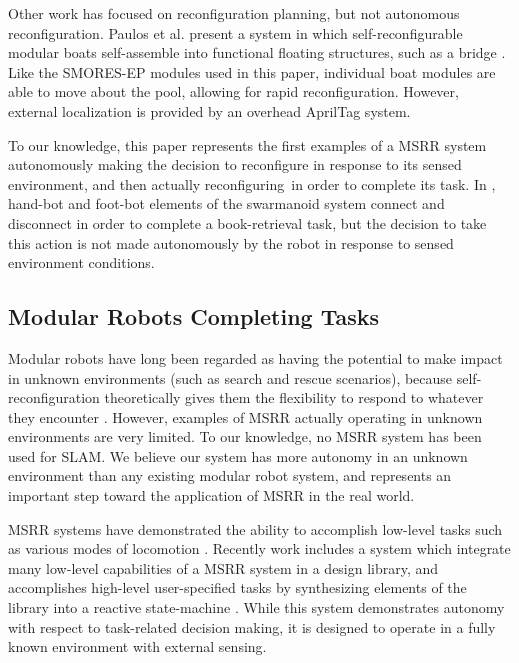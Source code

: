\documentclass[conference]{IEEEtran}
\begin{document}
Other work has focused on reconfiguration planning, but not autonomous reconfiguration.  Paulos et al. present a system in which self-reconfigurable modular boats self-assemble into functional floating structures, such as a bridge \cite{Paulos2015}.  Like the SMORES-EP modules used in this paper, individual boat modules are able to move about the pool, allowing for rapid reconfiguration.  However, external localization is provided by an overhead AprilTag system. 

To our knowledge, this paper represents the first examples of a MSRR system autonomously making the decision to reconfigure in response to its sensed environment, and then actually reconfiguring\ in order to complete its task.  In \cite{Dorigo2013}, hand-bot and foot-bot elements of the swarmanoid system connect and disconnect in order to complete a book-retrieval task, but the decision to take this action is not made autonomously by the robot in response to sensed environment conditions.
%
\subsection{Modular Robots Completing Tasks}
%
Modular robots have long been regarded as having the potential to make impact in unknown environments (such as search and rescue scenarios), because  self-reconfiguration theoretically gives them the flexibility to respond to whatever they encounter \cite{Yim2007a,Yim2000}.  However, examples of MSRR actually operating in unknown environments are very limited. To our knowledge, no MSRR system has been used for SLAM. We believe our system has more autonomy in an unknown environment than any existing modular robot system, and represents an important step toward the application of MSRR in the real world.

MSRR systems have demonstrated the ability to accomplish low-level tasks such as various modes of locomotion \cite{Yim1994}. Recently work includes a system which integrate many low-level capabilities of a MSRR system in a design library, and accomplishes high-level user-specified tasks by synthesizing elements of the library into a reactive state-machine \cite{Jing2016}. While this system demonstrates autonomy with respect to task-related decision making, it is designed to operate in a fully known environment with external sensing.
\end{document}
